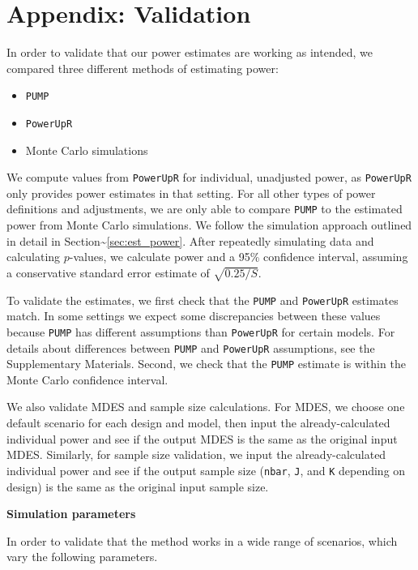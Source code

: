 \documentclass[
]{article}
\providecommand{\tightlist}{%
  \setlength{\itemsep}{0pt}\setlength{\parskip}{0pt}}
\begin{document}
\section{Appendix: Validation}

In order to validate that our power estimates are working as intended,
we compared three different methods of estimating power:

\begin{itemize}
\tightlist
\item
  \texttt{PUMP}
\item
  \texttt{PowerUpR}
\item
  Monte Carlo simulations
\end{itemize}

We compute values from \texttt{PowerUpR} for individual, unadjusted
power, as \texttt{PowerUpR} only provides power estimates in that
setting. For all other types of power definitions and adjustments, we
are only able to compare \texttt{PUMP} to the estimated power from Monte
Carlo simulations. We follow the simulation approach outlined in detail
in Section\textasciitilde{}\ref{sec:est_power}. After repeatedly
simulating data and calculating \(p\)-values, we calculate power and a
95\% confidence interval, assuming a conservative standard error
estimate of \(\sqrt{0.25/S}\).

To validate the estimates, we first check that the \texttt{PUMP} and
\texttt{PowerUpR} estimates match. In some settings we expect some
discrepancies between these values because \texttt{PUMP} has different
assumptions than \texttt{PowerUpR} for certain models. For details about
differences between \texttt{PUMP} and \texttt{PowerUpR} assumptions, see
the Supplementary Materials. Second, we check that the \texttt{PUMP}
estimate is within the Monte Carlo confidence interval.

We also validate MDES and sample size calculations. For MDES, we choose
one default scenario for each design and model, then input the
already-calculated individual power and see if the output MDES is the
same as the original input MDES. Similarly, for sample size validation,
we input the already-calculated individual power and see if the output
sample size (\texttt{nbar}, \texttt{J}, and \texttt{K} depending on
design) is the same as the original input sample size.

\textbf{Simulation parameters}

In order to validate that the method works in a wide range of scenarios,
which vary the following parameters.
\end{document}
